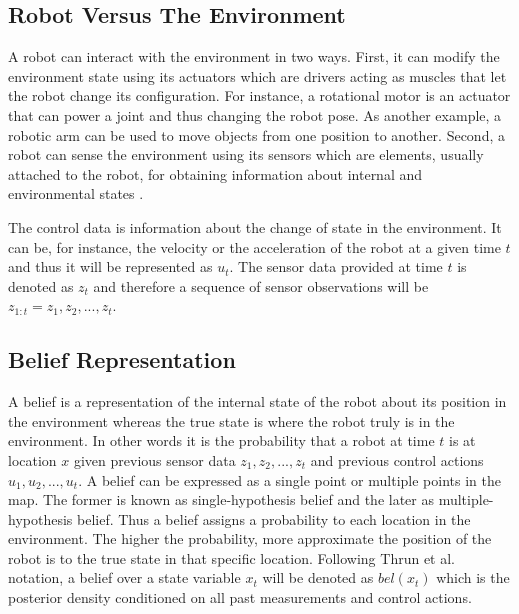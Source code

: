 \subsection{Robot Versus The Environment}

A robot can interact with the environment in two ways. First, it can modify the environment state using its actuators which are drivers acting as muscles that let the robot change its configuration\cite{Reza:Theory-of-applied-robotics}. For instance, a rotational motor is an actuator that can power a joint and thus changing the robot pose. As another example, a robotic arm can be used to move objects from one position to another. Second, a robot can sense the environment using its sensors which are elements, usually attached to the robot, for obtaining information about internal and environmental states \cite{Reza:Theory-of-applied-robotics}\cite{Thrun:2005:PR:1121596}. 

The control data is information about the change of state in the environment\cite{Thrun:2005:PR:1121596}. It can be, for instance, the velocity or the acceleration of the robot at a given time $t$ and thus it will be represented as $u_t$.  The sensor data provided at time $t$ is denoted as $z_t$ and therefore a sequence of sensor observations will be $z_{1:t}= {z_1, z_2, ..., z_t}$.

\subsection{Belief Representation}\label{ch-2:sub:belief-representation}

A belief is a representation of the internal state of the robot about its position in the environment whereas the true state is where the robot truly is in the environment. In other words it is the probability that a robot at time $t$ is at location $x$ given previous sensor data $z_1, z_2, ..., z_t$ and previous control actions $u_1, u_2, ..., u_t$. A belief can be expressed as a single point or multiple points in the map. The former is known as single-hypothesis belief and the later as multiple-hypothesis belief\cite{Siegwart:intro-autonumous-robots}. Thus a belief assigns a probability to each location in the environment. The higher the probability, more approximate the position of the robot is to the true state in that specific location. Following Thrun et al. notation, a belief over a state variable $x_t$ will be denoted as $bel(x_t)$ which is the posterior density conditioned on all past measurements and control actions.

